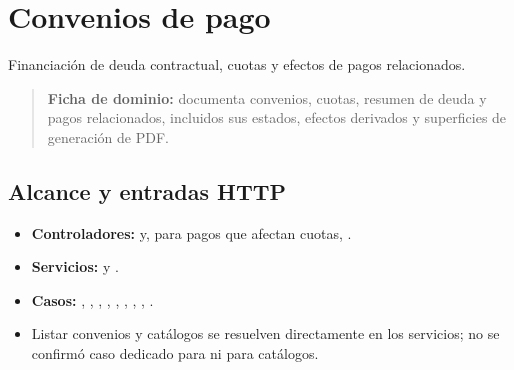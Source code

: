 \section{Convenios de pago}


Financiación de deuda contractual, cuotas y efectos de pagos relacionados.


\begin{quote}
\textbf{Ficha de dominio:} documenta convenios, cuotas, resumen de deuda y pagos relacionados, incluidos sus estados, efectos derivados y superficies de generación de PDF.
\end{quote}


\subsection{Alcance y entradas HTTP}


\begin{itemize}
\item \textbf{Controladores:} \texttt{} y, para pagos que afectan cuotas, \texttt{}.
\item \textbf{Servicios:} \texttt{} y \texttt{}.
\item \textbf{Casos:} \texttt{}, \texttt{}, \texttt{}, \texttt{}, \texttt{}, \texttt{}, \texttt{}, \texttt{}, \texttt{}.
\item Listar convenios y catálogos se resuelven directamente en los servicios; no se confirmó caso dedicado para \texttt{} ni para catálogos.
\end{itemize}


